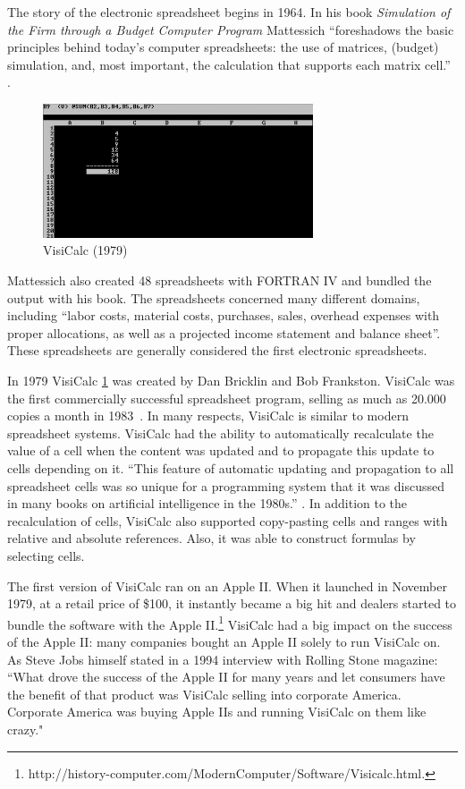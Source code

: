 The story of the electronic spreadsheet begins in 1964. In his book \emph{Simulation of the Firm through a Budget Computer Program} \cite{Mattessich1964} Mattessich ``foreshadows the basic principles behind today's computer spreadsheets: the use of matrices, (budget) simulation, and, most important, the calculation that supports each matrix cell.'' \cite{Chatfield1996}.

\begin{figure}
  \begin{center}
  \includegraphics[width=8cm]{fig/visicalc.png}
  \caption{VisiCalc (1979)}
  \label{fig:visical}
  \end{center}
\end{figure} 


Mattessich also created 48 spreadsheets with FORTRAN IV and bundled the output with his book. The spreadsheets concerned many different domains, including ``labor costs, material costs, purchases, sales, overhead expenses with proper allocations, as well as a projected income statement and balance sheet''. These spreadsheets are generally considered the first electronic spreadsheets. 

In 1979 VisiCalc \ref{fig:visical} was created by Dan Bricklin and Bob Frankston. VisiCalc was the first commercially successful spreadsheet program, selling as much as 20.000 copies a month in 1983~\cite{Slater1989}. In many respects, VisiCalc is similar to modern spreadsheet systems. VisiCalc had the ability to automatically recalculate the value of a cell when the content was updated and to propagate this update to cells depending on it. ``This feature of automatic updating and propagation to all spreadsheet cells was so unique for a programming system that it was discussed in many books on artificial intelligence in the 1980s.'' \cite{Freedman2006}. In addition to the recalculation of cells, VisiCalc also supported copy-pasting cells and ranges with relative and absolute references. Also, it was able to construct formulas by selecting cells. 

The first version of VisiCalc ran on an Apple II. When it launched in November 1979, at a retail price of \$100, it instantly became a big hit and dealers started to bundle the software with the Apple II.\footnote{http://history-computer.com/ModernComputer/Software/Visicalc.html.} VisiCalc had a big impact on the success of the Apple II: many companies bought an Apple II solely to run VisiCalc on. As Steve Jobs himself stated in a 1994 interview with Rolling Stone magazine: ``What drove the success of the Apple II for many years and let consumers have the benefit of that product was VisiCalc selling into corporate America. Corporate America was buying Apple IIs and running VisiCalc on them like crazy." 

